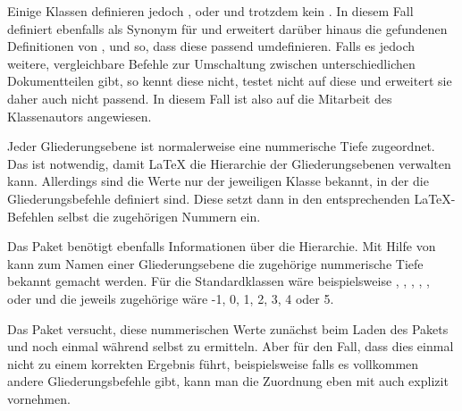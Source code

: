 Einige Klassen definieren jedoch ,
 oder  und
trotzdem kein . In diesem Fall definiert
  ebenfalls als Synonym für
 und erweitert darüber hinaus die gefundenen Definitionen von
,  und
 so, dass diese  passend
umdefinieren. Falls es jedoch weitere, vergleichbare Befehle zur Umschaltung
zwischen unterschiedlichen Dokumentteilen gibt, so kennt 
diese nicht, testet nicht auf diese und erweitert sie daher auch nicht
passend. In diesem Fall ist  also auf die Mitarbeit des
Klassenautors angewiesen.%
\EndIndexGroup


\begin{Declaration}
\end{Declaration}
Jeder Gliederungsebene ist normalerweise eine nummerische Tiefe
zugeordnet. Das ist notwendig, damit \LaTeX{} die Hierarchie der
Gliederungsebenen verwalten kann. Allerdings sind die Werte
nur der jeweiligen Klasse bekannt, in der die Gliederungsbefehle definiert
sind. Diese setzt dann in den entsprechenden \LaTeX-Befehlen selbst die
zugehörigen Nummern ein.

{\setlength{\emergencystretch}{1em}%
Das Paket  benötigt ebenfalls Informationen über die
Hierarchie. Mit Hilfe von  kann
 zum Namen einer Gliederungsebene die zugehörige nummerische
Tiefe bekannt gemacht werden. Für die Standardklassen wäre  beispielsweise , ,
, , ,
 oder  und die jeweils zugehörige
 wäre -1, 0, 1, 2, 3, 4 oder 5.\par}

Das Paket  versucht, diese nummerischen Werte zunächst beim
Laden des Pakets und noch einmal während 
selbst zu ermitteln. Aber für den Fall, dass dies einmal nicht zu einem
korrekten Ergebnis führt, beispielsweise falls es vollkommen andere
Gliederungsbefehle gibt, kann man die Zuordnung eben mit
 auch explizit vornehmen.%
%
\EndIndexGroup


